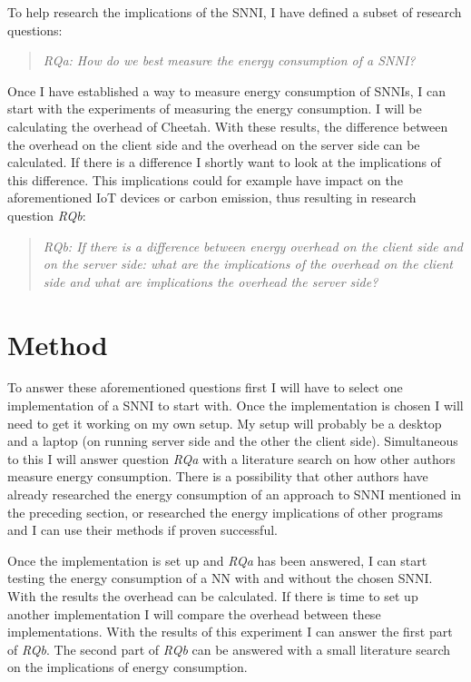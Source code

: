 \documentclass[../thesis.tex]{subfiles}
\begin{document}
\noindent To help research the implications of the SNNI, I have defined a subset of research questions:

\begin{quote} \emph{RQa: How do we best measure the energy consumption of a SNNI?} \end{quote}

\noindent Once I have established a way to measure energy consumption of SNNIs, I can start with the experiments of measuring the energy consumption. I will be calculating the overhead of Cheetah. With these results, the difference between the overhead on the client side and the overhead on the server side can be calculated. If there is a difference I shortly want to look at the implications of this difference. This implications could for example have impact on the aforementioned IoT devices or carbon emission, thus resulting in research question \textit{RQb}:

\begin{quote} \emph{RQb: If there is a difference between energy overhead on the client side and on the server side: what are the implications of the overhead on the client side and what are implications the overhead the server side?} \end{quote}

\section{Method}
To answer these aforementioned questions first I will have to select one implementation of a SNNI to start with. Once the implementation is chosen I will need to get it working on my own setup. My setup will probably be a desktop and a laptop (on running server side and the other the client side). Simultaneous to this I will answer question \textit{RQa} with a literature search on how other authors measure energy consumption. There is a possibility that other authors have already researched the energy consumption of an approach to SNNI mentioned in the preceding section, or researched the energy implications of other programs and I can use their methods if proven successful.

Once the implementation is set up and \textit{RQa} has been answered, I can start testing the energy consumption of a NN with and without the chosen SNNI. With the results the overhead can be calculated. If there is time to set up another implementation I will compare the overhead between these implementations. With the results of this experiment I can answer the first part of \textit{RQb}. The second part of \textit{RQb} can be answered with a small literature search on the implications of energy consumption. 
\end{document}
